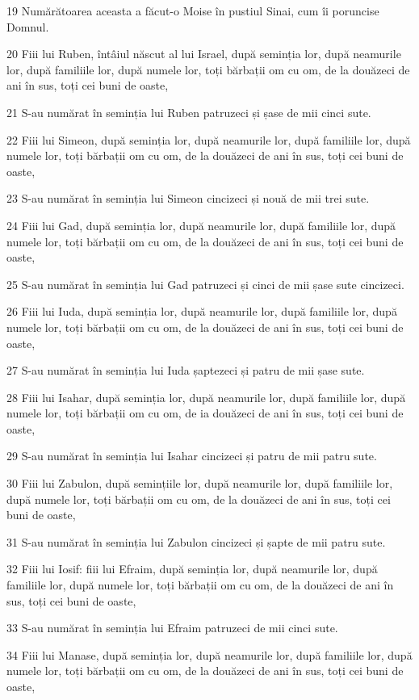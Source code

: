 \par 19 Numărătoarea aceasta a făcut-o Moise în pustiul Sinai, cum îi poruncise Domnul.
\par 20 Fiii lui Ruben, întâiul născut al lui Israel, după seminția lor, după neamurile lor, după familiile lor, după numele lor, toți bărbații om cu om, de la douăzeci de ani în sus, toți cei buni de oaste,
\par 21 S-au numărat în seminția lui Ruben patruzeci și șase de mii cinci sute.
\par 22 Fiii lui Simeon, după seminția lor, după neamurile lor, după familiile lor, după numele lor, toți bărbații om cu om, de la douăzeci de ani în sus, toți cei buni de oaste,
\par 23 S-au numărat în seminția lui Simeon cincizeci și nouă de mii trei sute.
\par 24 Fiii lui Gad, după seminția lor, după neamurile lor, după familiile lor, după numele lor, toți bărbații om cu om, de la douăzeci de ani în sus, toți cei buni de oaste,
\par 25 S-au numărat în seminția lui Gad patruzeci și cinci de mii șase sute cincizeci.
\par 26 Fiii lui Iuda, după seminția lor, după neamurile lor, după familiile lor, după numele lor, toți bărbații om cu om, de la douăzeci de ani în sus, toți cei buni de oaste,
\par 27 S-au numărat în seminția lui Iuda șaptezeci și patru de mii șase sute.
\par 28 Fiii lui Isahar, după seminția lor, după neamurile lor, după familiile lor, după numele lor, toți bărbații om cu om, de ia douăzeci de ani în sus, toți cei buni de oaste,
\par 29 S-au numărat în seminția lui Isahar cincizeci și patru de mii patru sute.
\par 30 Fiii lui Zabulon, după semințiile lor, după neamurile lor, după familiile lor, după numele lor, toți bărbații om cu om, de la douăzeci de ani în sus, toți cei buni de oaste,
\par 31 S-au numărat în seminția lui Zabulon cincizeci și șapte de mii patru sute.
\par 32 Fiii lui Iosif: fiii lui Efraim, după seminția lor, după neamurile lor, după familiile lor, după numele lor, toți bărbații om cu om, de la douăzeci de ani în sus, toți cei buni de oaste,
\par 33 S-au numărat în seminția lui Efraim patruzeci de mii cinci sute.
\par 34 Fiii lui Manase, după seminția lor, după neamurile lor, după familiile lor, după numele lor, toți bărbații om cu om, de la douăzeci de ani în sus, toți cei buni de oaste,
